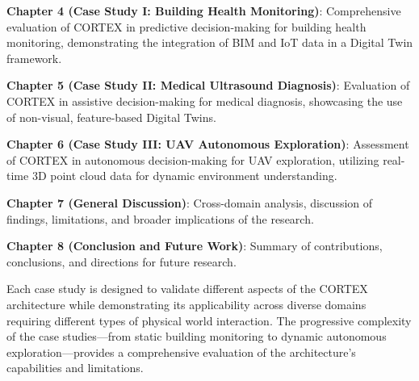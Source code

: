 \textbf{Chapter 4 (Case Study I: Building Health Monitoring)}: Comprehensive evaluation of CORTEX in predictive decision-making for building health monitoring, demonstrating the integration of BIM and IoT data in a Digital Twin framework.

\textbf{Chapter 5 (Case Study II: Medical Ultrasound Diagnosis)}: Evaluation of CORTEX in assistive decision-making for medical diagnosis, showcasing the use of non-visual, feature-based Digital Twins.

\textbf{Chapter 6 (Case Study III: UAV Autonomous Exploration)}: Assessment of CORTEX in autonomous decision-making for UAV exploration, utilizing real-time 3D point cloud data for dynamic environment understanding.

\textbf{Chapter 7 (General Discussion)}: Cross-domain analysis, discussion of findings, limitations, and broader implications of the research.

\textbf{Chapter 8 (Conclusion and Future Work)}: Summary of contributions, conclusions, and directions for future research.

Each case study is designed to validate different aspects of the CORTEX architecture while demonstrating its applicability across diverse domains requiring different types of physical world interaction. The progressive complexity of the case studies—from static building monitoring to dynamic autonomous exploration—provides a comprehensive evaluation of the architecture's capabilities and limitations.